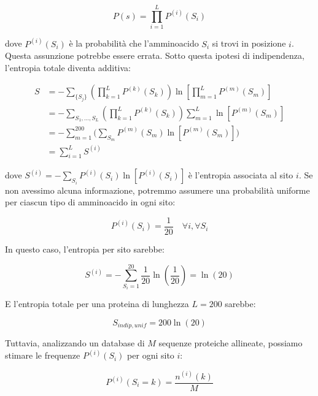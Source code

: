 \begin{equation} \label{eq:ch24_2}
P(s) = \prod_{i=1}^{L} P^{(i)}(S_i)
\end{equation}

dove $P^{(i)}(S_i)$ è la probabilità che l'amminoacido $S_i$ si trovi in posizione $i$. Questa assunzione potrebbe essere errata.
Sotto questa ipotesi di indipendenza, l'entropia totale diventa additiva:

\begin{align} 
S &= -\sum_{\{S_j\}} \left( \prod_{k=1}^{L} P^{(k)}(S_k) \right) \ln\left[ \prod_{m=1}^{L} P^{(m)}(S_m) \right] \nonumber \\
&= -\sum_{S_1, \dots, S_L} \left( \prod_{k=1}^{L} P^{(k)}(S_k) \right) \sum_{m=1}^{L} \ln[P^{(m)}(S_m)] \nonumber \\
&= -\sum_{m=1}^{200} \Biggl( \sum_{S_m} P^{(m)}(S_m) \ln[P^{(m)}(S_m)] \Biggr) \nonumber \\
&= \sum_{i=1}^{L} S^{(i)} \label{eq:ch24_3}
\end{align}

dove $S^{(i)} = -\sum_{S_i} P^{(i)}(S_i) \ln[P^{(i)}(S_i)]$ è l'entropia associata al sito $i$.
Se non avessimo alcuna informazione, potremmo assumere una probabilità uniforme per ciascun tipo di amminoacido in ogni sito:

\begin{equation} \label{eq:ch24_4}
P^{(i)}(S_i) = \frac{1}{20} \quad \forall i, \forall S_i
\end{equation}

In questo caso, l'entropia per sito sarebbe:

\begin{equation} \label{eq:ch24_5}
S^{(i)} = -\sum_{S_i=1}^{20} \frac{1}{20} \ln\left(\frac{1}{20}\right) = \ln(20)
\end{equation}

E l'entropia totale per una proteina di lunghezza $L=200$ sarebbe:

\begin{equation} \label{eq:ch24_6}
S_{indip,unif} = 200 \ln(20)
\end{equation}

Tuttavia, analizzando un database di $M$ sequenze proteiche allineate, possiamo stimare le frequenze $P^{(i)}(S_i)$ per ogni sito $i$:

\begin{equation} \label{eq:ch24_7}
P^{(i)}(S_i=k) = \frac{n^{(i)}(k)}{M}
\end{equation}

